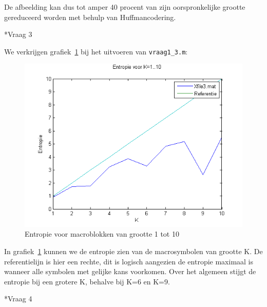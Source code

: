 \documentclass[]{article}
\begin{document}
\begin{section}
\begin{subsection}
        De afbeelding kan dus tot amper 40 procent van zijn
        oorspronkelijke grootte gereduceerd worden met behulp van
        Huffmancodering.

    \end{subsection}

    \begin{subsection}*{Vraag 3}

        We verkrijgen grafiek~\ref{fig:vraag1_3} bij het uitvoeren van \texttt{vraag1\_3.m}:

        \begin{figure}[h]
            \centering
            \includegraphics[width=\textwidth]{vraag1_3.png}
            \caption{Entropie voor macroblokken van grootte 1 tot 10}
            \label{fig:vraag1_3}
        \end{figure}

        In grafiek~\ref{fig:vraag1_3} kunnen we de entropie zien van de macrosymbolen van
        grootte K. De referentielijn is hier een rechte, dit is logisch
        aangezien de entropie maximaal is wanneer alle symbolen met
        gelijke kans voorkomen.
        Over het algemeen stijgt de entropie bij een grotere K, behalve
        bij K=6 en K=9.

    \end{subsection}

    \begin{subsection}*{Vraag 4}


\end{subsection}
\end{section}
\end{document}
